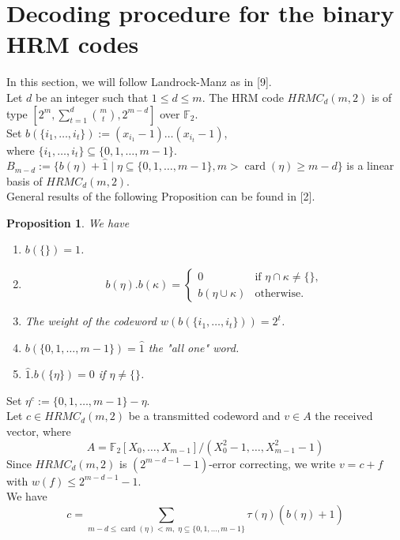 \documentclass{article}
\theoremstyle{plain}
\newtheorem{prop}[thm]{Proposition}
\theoremstyle{definition}
\DeclareMathOperator{\card}{card}
\begin{document}
\section{Decoding procedure for the binary HRM codes}
In this section, we will follow Landrock-Manz as in [9].\\
Let $d$ be an integer such that $1\leq d\leq m$. The HRM code $HRMC_{d}(m,2)$ is of type $\left[2^m,\sum_{t=1}^{d}\binom{m}{t},2^{m-d}\right]$ over $\mathbb{F}_{2}$.\\
Set $b(\{i_{1},\ldots,i_{t}\}):=(x_{i_{1}}-1)\ldots(x_{i_{t}}-1)$,\\
where $\{i_{1},\ldots,i_{t}\}\subseteq\{0,1,\ldots,m-1\}$.\\
$B_{m-d}:=\{b(\eta)+\hat{1}\mid \eta\subseteq \{0,1,\ldots,m-1\},m > \card(\eta)\geq m-d\}$ is a linear basis of $HRMC_{d}(m,2)$.\\
General results of the following Proposition can be found in [2].
\begin{prop}\label{Jennprop}
We have
\begin{enumerate}
\item $b(\{\})=1$.
\item \begin{equation*}
b(\eta).b(\kappa)=\begin{cases}
         0& \text{if $\eta\cap\kappa\neq\{\}$},\\
         b(\eta\cup\kappa)& \text{otherwise}.
\end{cases}
\end{equation*}
\item The weight of the codeword $w(b(\{i_{1},\ldots,i_{t}\}))=2^t$.
\item $b(\{0,1,\ldots,m-1\})=\hat{1}$ the "all one" word.
\item $\hat{1}.b(\{\eta\})=0$ if $\eta\neq \{\}$.
\end{enumerate}
\end{prop}
\noindent Set $\eta^c:=\{0,1,\ldots,m-1\}-\eta$.\\
Let $c\in HRMC_{d}(m,2)$ be a transmitted codeword and $v\in A$ the received vector, where
\begin{equation*}
A=\mathbb{F}_{2}[X_{0},\ldots ,X_{m-1}]/(X_{0}^{2}-1,\ldots ,X_{m-1}^{2}-1)
\end{equation*}
Since $HRMC_{d}(m,2)$ is $(2^{m-d-1}-1)$-error correcting, we write $v=c+f$ with $w(f)\leq 2^{m-d-1}-1$.\\
We have
\begin{equation*}
c=\sum_{m-d\leq\card(\eta)<m,\; \eta\subseteq \{0,1,\ldots,m-1\}}\tau(\eta)(b(\eta)+\hat{1})
\end{equation*}
\end{document}
